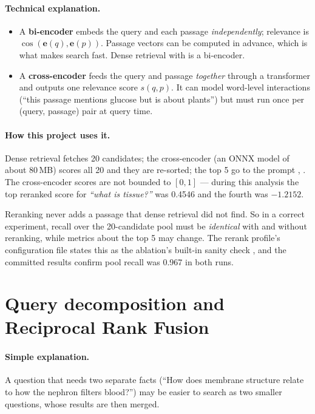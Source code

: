 \paragraph{Technical explanation.}
\begin{itemize}
  \item A \textbf{bi-encoder} embeds the query and each passage \emph{independently}; relevance is $\cos(\mathbf{e}(q),\mathbf{e}(p))$. Passage vectors can be computed in advance, which is what makes search fast. Dense retrieval with  is a bi-encoder.
  \item A \textbf{cross-encoder} feeds the query and passage \emph{together} through a transformer and outputs one relevance score $s(q,p)$. It can model word-level interactions (``this passage mentions glucose but is about plants'') but must run once per (query, passage) pair at query time.
\end{itemize}

\paragraph{How this project uses it.} Dense retrieval fetches 20 candidates; the cross-encoder  (an ONNX model of about 80\,MB) scores all 20 and they are re-sorted; the top 5 go to the prompt , . The cross-encoder scores are not bounded to $[0,1]$ --- during this analysis the top reranked score for \emph{``what is tissue?''} was 0.4546 and the fourth was $-1.2152$.

\begin{keyidea}
Reranking never adds a passage that dense retrieval did not find. So in a correct experiment, recall over the 20-candidate pool must be \emph{identical} with and without reranking, while metrics about the top 5 may change. The rerank profile's configuration file states this as the ablation's built-in sanity check , and the committed results confirm pool recall was 0.967 in both runs.
\end{keyidea}

\section{Query decomposition and Reciprocal Rank Fusion}
\label{sec:rrf}

\paragraph{Simple explanation.} A question that needs two separate facts (``How does membrane structure relate to how the nephron filters blood?'') may be easier to search as two smaller questions, whose results are then merged.

